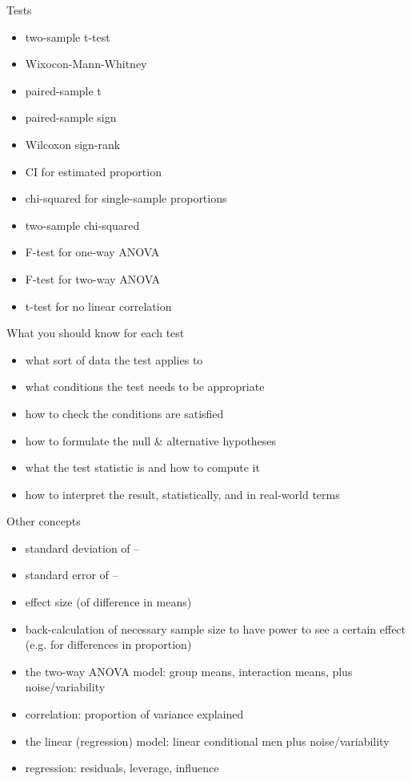 \begin{frame}{Tests}

  \begin{itemize}
    \item two-sample t-test
    \item Wixocon-Mann-Whitney
    \item paired-sample t
    \item paired-sample sign
    \item Wilcoxon sign-rank
    \item CI for estimated proportion
    \item chi-squared for single-sample proportions
    \item two-sample chi-squared
    \item F-test for one-way ANOVA
    \item F-test for two-way ANOVA
    \item t-test for no linear correlation
  \end{itemize}

\end{frame}

\begin{frame}{What you should know for each test}

  \begin{itemize}
    \item what sort of data the test applies to
    \item what conditions the test needs to be appropriate
    \item how to check the conditions are satisfied
    \item how to formulate the null \& alternative hypotheses
    \item what the test statistic is and how to compute it
    \item how to interpret the result, statistically, and in real-world terms
  \end{itemize}


\end{frame}

\begin{frame}{Other concepts}
  
  \begin{itemize}
    \item standard deviation of --
    \item standard error of --
    \item effect size (of difference in means)
    \item back-calculation of necessary sample size to have power to see a certain effect (e.g. for differences in proportion)
    \item the two-way ANOVA model: group means, interaction means, plus noise/variability
    \item correlation: proportion of variance explained
    \item the linear (regression) model: linear conditional men plus noise/variability
    \item regression: residuals, leverage, influence
  \end{itemize}


\end{frame}


